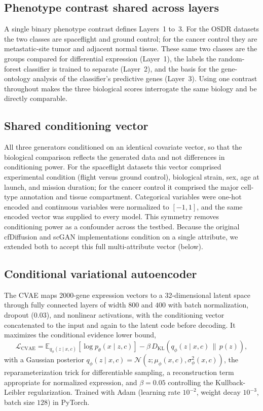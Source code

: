\documentclass[11pt]{article}
\begin{document}
\subsection{Phenotype contrast shared across layers}
A single binary phenotype contrast defines Layers~1 to~3. For the OSDR datasets the two classes are spaceflight and ground control; for the cancer control they are metastatic-site tumor and adjacent normal tissue. These same two classes are the groups compared for differential expression (Layer~1), the labels the random-forest classifier is trained to separate (Layer~2), and the basis for the gene-ontology analysis of the classifier's predictive genes (Layer~3). Using one contrast throughout makes the three biological scores interrogate the same biology and be directly comparable.

\subsection{Shared conditioning vector}
All three generators conditioned on an identical covariate vector, so that the biological comparison reflects the generated data and not differences in conditioning power. For the spaceflight datasets this vector comprised experimental condition (flight versus ground control), biological strain, sex, age at launch, and mission duration; for the cancer control it comprised the major cell-type annotation and tissue compartment. Categorical variables were one-hot encoded and continuous variables were normalized to $[-1,1]$, and the same encoded vector was supplied to every model. This symmetry removes conditioning power as a confounder across the testbed. Because the original cfDiffusion and scGAN implementations condition on a single attribute, we extended both to accept this full multi-attribute vector (below).

\subsection{Conditional variational autoencoder}
The CVAE maps 2000-gene expression vectors to a 32-dimensional latent space through fully connected layers of width $800$ and $400$ with batch normalization, dropout ($0.03$), and nonlinear activations, with the conditioning vector concatenated to the input and again to the latent code before decoding. It maximizes the conditional evidence lower bound,
\begin{equation}
\mathcal{L}_{\mathrm{CVAE}} = \mathbb{E}_{q_\phi(z\mid x,c)}\left[\log p_\theta(x\mid z,c)\right] - \beta\, D_{\mathrm{KL}}\!\left(q_\phi(z\mid x,c)\,\|\,p(z)\right),
\end{equation}
with a Gaussian posterior $q_\phi(z\mid x,c)=\mathcal{N}(z;\mu_\phi(x,c),\sigma_\phi^2(x,c))$, the reparameterization trick for differentiable sampling, a reconstruction term appropriate for normalized expression, and $\beta=0.05$ controlling the Kullback-Leibler regularization. Trained with Adam (learning rate $10^{-2}$, weight decay $10^{-3}$, batch size $128$) in PyTorch.
\end{document}
